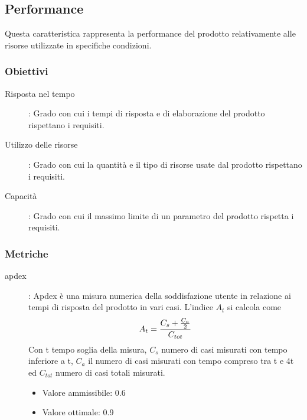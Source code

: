 \documentclass[../piano-di-qualifica.tex]{subfiles}
\begin{document}


\subsection{Performance}%
\label{sub:performance}
 Questa caratteristica rappresenta la performance del prodotto relativamente alle risorse utilizzate in specifiche condizioni.
  \subsubsection{Obiettivi}%
  \label{subs:obiettivi}
      \begin{description}
        \item [Risposta nel tempo]: Grado con cui i tempi di risposta e di elaborazione del prodotto rispettano i requisiti.
        \item [Utilizzo delle risorse]: Grado con cui la quantità e il tipo di risorse usate dal prodotto rispettano i requisiti.
        \item [Capacità]: Grado con cui il massimo limite di un parametro del prodotto rispetta i requisiti.
      \end{description}

  \subsubsection{Metriche}%
  \label{subs:metriche}
    \begin{description}
      \item [apdex]: Apdex è una misura numerica della soddisfazione utente in relazione ai tempi di risposta del prodotto in vari casi. L'indice \(A_t\) si calcola come \begin{equation} A_t = \frac{C_s + \frac{C_a}{2}}{C_{tot}} \\ \end{equation} Con t tempo soglia della misura, \(C_s\) numero di casi misurati con tempo inferiore a t, \(C_a\) il numero di casi misurati con tempo compreso tra t e 4t ed \(C_{tot}\) numero di casi totali misurati.
      \begin{itemize} \item Valore ammissibile: 0.6 \item Valore ottimale: 0.9 \end{itemize}
    \end{description}
\end{document}
